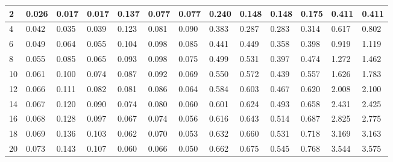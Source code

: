 \begin{table*}[]
\begin{tabular}{|l | lll| lll |lll |lll|}
2                  & 0.026 & 0.017             & 0.017             & 0.137 & 0.077             & 0.077             & 0.240 & 0.148             & 0.148             & 0.175 & 0.411             & 0.411             \\ \hline
4                  & 0.042 & 0.035             & 0.039             & 0.123 & 0.081             & 0.090             & 0.383 & 0.287             & 0.283             & 0.314 & 0.617             & 0.802             \\ \hline
6                  & 0.049 & 0.064             & 0.055             & 0.104 & 0.098             & 0.085             & 0.441 & 0.449             & 0.358             & 0.398 & 0.919             & 1.119             \\ \hline
\rowcolor{Gray}
8                  & 0.055 & 0.085             & 0.065             & 0.093 & 0.098             & 0.075             & 0.499 & 0.531             & 0.397             & 0.474 & 1.272             & 1.462             \\ \hline
10                 & 0.061 & 0.100             & 0.074             & 0.087 & 0.092             & 0.069             & 0.550 & 0.572             & 0.439             & 0.557 & 1.626             & 1.783             \\ \hline
12                 & 0.066 & 0.111             & 0.082             & 0.081 & 0.086             & 0.064             & 0.584 & 0.603             & 0.467             & 0.620 & 2.008             & 2.100             \\ \hline
14                 & 0.067 & 0.120             & 0.090             & 0.074 & 0.080             & 0.060             & 0.601 & 0.624             & 0.493             & 0.658 & 2.431             & 2.425             \\ \hline
16                 & 0.068 & 0.128             & 0.097             & 0.067 & 0.074             & 0.056             & 0.616 & 0.643             & 0.514             & 0.687 & 2.825             & 2.775             \\ \hline
18                 & 0.069 & 0.136             & 0.103             & 0.062 & 0.070             & 0.053             & 0.632 & 0.660             & 0.531             & 0.718 & 3.169             & 3.163             \\ \hline
20                 & 0.073 & 0.143             & 0.107             & 0.060 & 0.066             & 0.050             & 0.662 & 0.675             & 0.545             & 0.768 & 3.544             & 3.575            \\ \hline
\end{tabular}
\label{tab:combined_dt1}
\end{table*}


